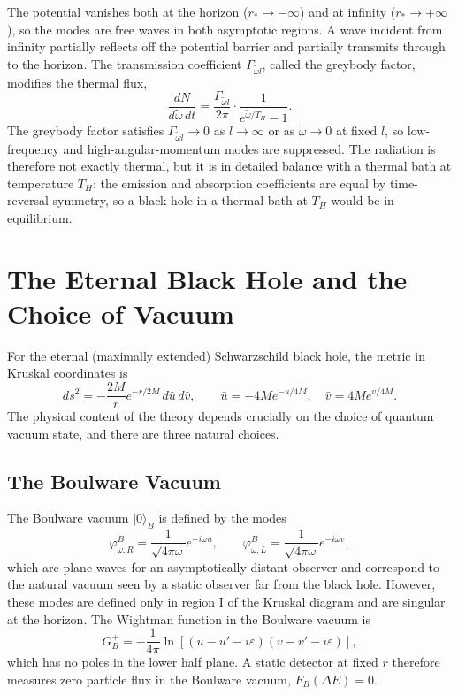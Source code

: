 
The potential vanishes both at the horizon ($r_*\to-\infty$) and at
infinity ($r_*\to+\infty$), so the modes are free waves in both
asymptotic regions. A wave incident from infinity partially reflects
off the potential barrier and partially transmits through to the
horizon. The transmission coefficient $\Gamma_{\tilde\omega l}$,
called the greybody factor, modifies the thermal flux,
\begin{equation}
    \frac{dN}{d\tilde\omega\,dt}
    = \frac{\Gamma_{\tilde\omega l}}{2\pi}
    \cdot\frac{1}{e^{\tilde\omega/T_H}-1}.
\end{equation}
The greybody factor satisfies $\Gamma_{\tilde\omega l}\to 0$ as
$l\to\infty$ or as $\tilde\omega\to 0$ at fixed $l$, so low-frequency
and high-angular-momentum modes are suppressed. The radiation is
therefore not exactly thermal, but it is in detailed balance with a
thermal bath at temperature $T_H$: the emission and absorption
coefficients are equal by time-reversal symmetry, so a black hole in
a thermal bath at $T_H$ would be in equilibrium.

\section{The Eternal Black Hole and the Choice of Vacuum}

For the eternal (maximally extended) Schwarzschild black hole, the
metric in Kruskal coordinates is
\begin{equation}
    ds^2 = -\frac{2M}{r}e^{-r/2M}\,d\bar u\,d\bar v,
    \qquad
    \bar u = -4Me^{-u/4M},\quad
    \bar v = 4Me^{v/4M}.
\end{equation}
The physical content of the theory depends crucially on the choice of
quantum vacuum state, and there are three natural choices.

\subsection*{The Boulware Vacuum}

The Boulware vacuum $|0\rangle_B$ is defined by the modes
\begin{equation}
    \varphi^B_{\omega,R} = \frac{1}{\sqrt{4\pi\omega}}e^{-i\omega u},
    \qquad
    \varphi^B_{\omega,L} = \frac{1}{\sqrt{4\pi\omega}}e^{-i\omega v},
\end{equation}
which are plane waves for an asymptotically distant observer and
correspond to the natural vacuum seen by a static observer far from
the black hole. However, these modes are defined only in region I of
the Kruskal diagram and are singular at the horizon. The Wightman
function in the Boulware vacuum is
\begin{equation}
    G^+_B = -\frac{1}{4\pi}\ln\left[
    (u-u'-i\varepsilon)(v-v'-i\varepsilon)\right],
\end{equation}
which has no poles in the lower half plane. A static detector at fixed
$r$ therefore measures zero particle flux in the Boulware vacuum,
$F_B(\Delta E) = 0$.

